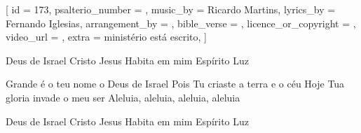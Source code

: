 
[
    id                     = {173},
    psalterio_number       = {},
    music_by               = {Ricardo Martins},
    lyrics_by              = {Fernando Iglesias},
    arrangement_by         = {},
    bible_verse            = {},
    licence_or_copyright   = {},
    video_url              = {},
    extra                  = {ministério está escrito},
]


\beginverse
Deus de Israel
Cristo Jesus
Habita em mim
Espírito Luz
\endverse

\beginverse
Grande é o teu nome o Deus de Israel
Pois Tu criaste a terra e o céu
Hoje Tua gloria invade o meu ser
Aleluia, aleluia, aleluia, aleluia
\endverse

\beginverse
Deus de Israel
Cristo Jesus
Habita em mim
Espírito Luz
\endverse


\endsong
